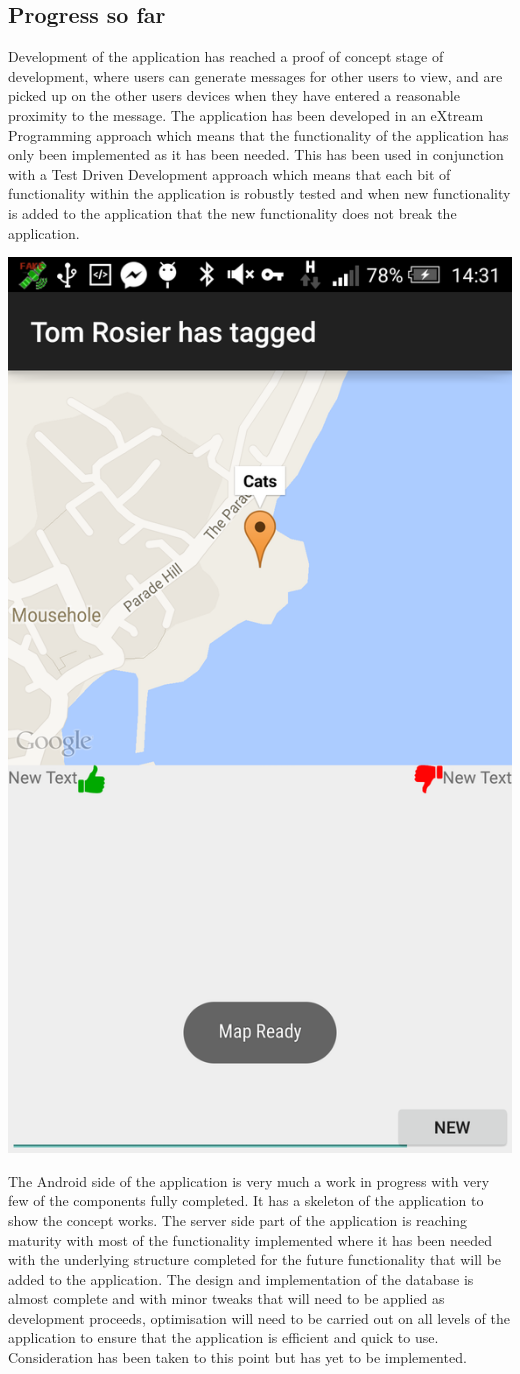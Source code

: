 \documentclass[a0,landscape]{a0poster}
\begin{document}
\begin{multicols}{5}
\section{Progress so far}

Development of the application has reached a proof of concept stage of development, where users can generate messages for other users to view, and are picked up on the other users devices when they have entered a reasonable proximity to the message. The application has been developed in an eXtream Programming approach which means that the functionality of the application has only been implemented as it has been needed. This has been used in conjunction with a Test Driven Development approach which means that each bit of functionality within the application is robustly tested and when new functionality is added to the application that the new functionality does not break the application.\\

\begin{center}
\includegraphics[width=0.39\linewidth]{viewing}
\end{center}

The Android side of the application is very much a work in progress with very few of the components fully completed. It has a skeleton of the application to show the concept works. The server side part of the application is reaching maturity with most of the functionality implemented where it has been needed with the underlying structure completed for the future functionality that will be added to the application. The design and implementation of the database is almost complete and with minor tweaks that will need to be applied as development proceeds, optimisation will need to be carried out on all levels of the application to ensure that the application is efficient and quick to use. Consideration has been taken to this point but has yet to be implemented.


\end{multicols}
\end{document}

